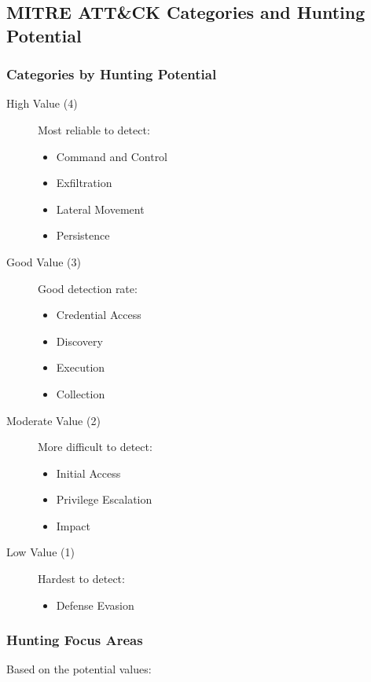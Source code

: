 \subsection{MITRE ATT\&CK Categories and Hunting Potential}

\subsubsection{Categories by Hunting Potential}
\begin{description}
   \item[High Value (4)] Most reliable to detect:
   \begin{itemize}
       \item Command and Control
       \item Exfiltration
       \item Lateral Movement
       \item Persistence
   \end{itemize}

   \item[Good Value (3)] Good detection rate:
   \begin{itemize}
       \item Credential Access
       \item Discovery 
       \item Execution
       \item Collection
   \end{itemize}

   \item[Moderate Value (2)] More difficult to detect:
   \begin{itemize}
       \item Initial Access
       \item Privilege Escalation
       \item Impact
   \end{itemize}

   \item[Low Value (1)] Hardest to detect:
   \begin{itemize}
       \item Defense Evasion
   \end{itemize}
\end{description}

\subsubsection{Hunting Focus Areas}
Based on the potential values:

